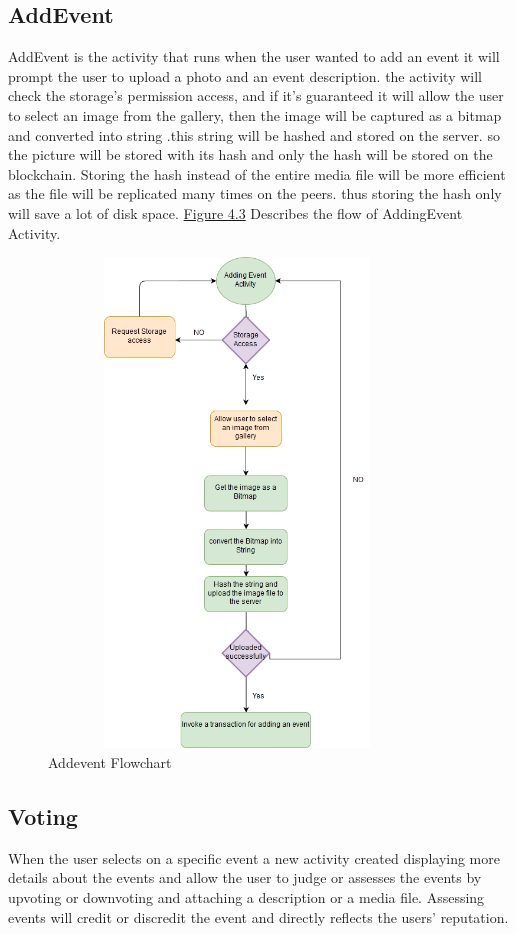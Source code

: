 \subsection{AddEvent}
AddEvent is the activity that runs when the user wanted to add an event it will prompt the user to upload a photo and an event description. the activity will check the storage's permission access, and if it's guaranteed it will allow the user to select an image from the gallery, then the image will be captured as a bitmap and converted into string .this string will be hashed and stored on the server. so the picture will be stored with its hash and only the hash will be stored on the blockchain. Storing the hash instead of the entire media file will be more efficient as the file will be replicated many times on the peers. thus storing the hash only will save a lot of disk space.    
\hyperref[fig:mainactivityflow]{Figure 4.3} Describes the flow of AddingEvent Activity. 
 \begin{figure}[H]
\center
\includegraphics[width=10cm,height=13cm]{images/addingeventflowchart.png}
\caption{Addevent Flowchart}
\label{fig:addingeventflowchart}
\end{figure}

\subsection{Voting}
When the user selects on a specific event a new activity created displaying more details about the events and allow the user to judge or assesses the events by upvoting or downvoting and attaching a description or a media file. Assessing events will credit or discredit the event and directly reflects the users' reputation. 

